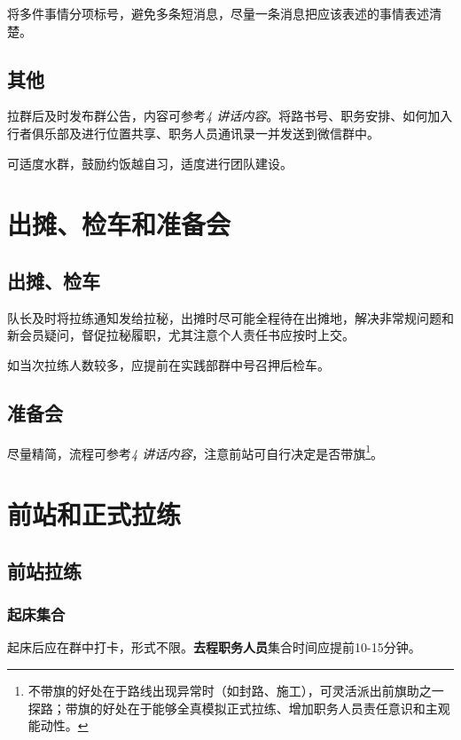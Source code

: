 \documentclass[UTF8]{ctexart}
\begin{document}
将多件事情分项标号，避免多条短消息，尽量一条消息把应该表述的事情表述清楚。

\subsection{其他}

拉群后及时发布群公告，内容可参考{\color{blue}\textit{4 讲话内容}}。将路书号、职务安排、如何加入行者俱乐部及进行位置共享、职务人员通讯录一并发送到微信群中。

可适度水群，鼓励约饭越自习，适度进行团队建设。

\section{出摊、检车和准备会}

\subsection{出摊、检车}

队长及时将拉练通知发给拉秘，出摊时尽可能全程待在出摊地，解决非常规问题和新会员疑问，督促拉秘履职，尤其注意个人责任书应按时上交。

如当次拉练人数较多，应提前在实践部群中号召押后检车。

\subsection{准备会}

尽量精简，流程可参考{\color{blue}\textit{4 讲话内容}}，注意前站可自行决定是否带旗\footnote{不带旗的好处在于路线出现异常时（如封路、施工），可灵活派出前旗助之一探路；带旗的好处在于能够全真模拟正式拉练、增加职务人员责任意识和主观能动性。}。

\section{前站和正式拉练}

\subsection{前站拉练}

\subsubsection{起床集合}

起床后应在群中打卡，形式不限。\textbf{去程职务人员}集合时间应提前10-15分钟。
\end{document}
